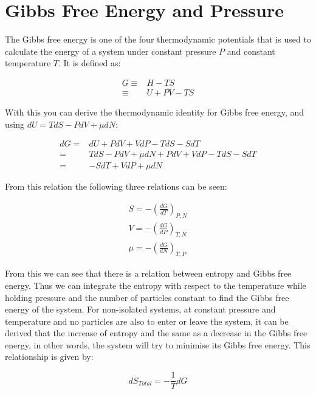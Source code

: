 \documentclass[../hand-in3.tex]{subfiles}
\begin{document}
\section{Gibbs Free Energy and Pressure}

The Gibbs free energy is one of the four thermodynamic potentials that is used to calculate the energy of a system under constant pressure $P$ and constant temperature $T$. It is defined as:

\begin{align}
G \equiv& H - TS \\
  \equiv& U +PV -TS 	
\end{align}

With this you can derive the thermodynamic identity for Gibbs free energy, and using $dU = TdS - PdV + \mu dN$:

\begin{align}
dG =& dU + PdV + VdP -TdS -SdT \\
   =& TdS - PdV + \mu dN + PdV + VdP -TdS -SdT \\ 
   =& -SdT + VdP + \mu dN
\end{align}

From this relation the following three relations can be seen:

\begin{align}
S = - \left( \frac{dG}{dT} \right)_{P,N} \\
V = - \left( \frac{dG}{dP} \right)_{T,N} \\
\mu = - \left( \frac{dG}{dN} \right)_{T,P} 
\end{align}

From this we can see that there is a relation between entropy and Gibbs free energy. Thus we can integrate the entropy with respect to the temperature while holding pressure and the number of particles constant to find the Gibbs free energy of the system. For non-isolated systems, at constant pressure and temperature and no particles are also to enter or leave the system, it can be derived that the increase of entropy and the same as a decrease in the Gibbs free energy, in other words, the system will try to minimise its Gibbs free energy. This relationship is given by:

\begin{equation}
dS_{Total} = - \frac{1}{T} dG
\end{equation}
\end{document}
